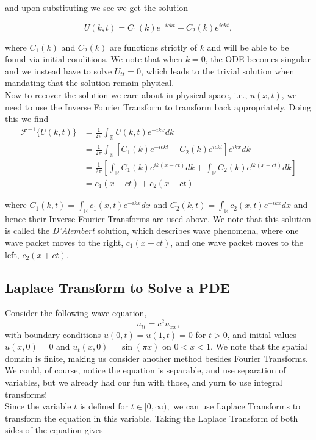 and upon substituting we see we get the solution

$$U(k,t) = C_1(k)e^{-ickt} + C_2(k) e^{ickt},$$

where $C_1(k)$ and $C_2(k)$ are functions strictly of $k$ and will be able to be found via initial conditions. We note that when $k=0$, the ODE becomes singular and we instead have to solve $U_{tt} = 0$, which leads to the trivial solution when mandating that the solution remain physical. \\

Now to recover the solution we care about in physical space, i.e., $u(x,t)$, we need to use the Inverse Fourier Transform to transform back appropriately. Doing this we find
\begin{align*}
\mathscr{F}^{-1}\{ U(k,t)  \} &= \frac{1}{2\pi} \int_{\mathbb{R}} U(k,t) e^{-ikx} dk\\
&= \frac{1}{2\pi} \int_{\mathbb{R}} \left[ C_1(k) e^{-ickt} + C_2(k) e^{ickt} \right] e^{ikx} dk\\
&= \frac{1}{2\pi} \left[ \int_{\mathbb{R}} C_1(k) e^{ik(x-ct)} dk + \int_{\mathbb{R}} C_2(k) e^{ik(x+ct)} dk  \right] \\
&= c_1(x-ct) + c_2(x+ct) 
\end{align*}

where $C_1(k,t) = \int_{\mathbb{R}} c_1(x,t) e^{-ikx} dx$ and $C_2(k,t) = \int_{\mathbb{R}} c_2(x,t) e^{-ikx} dx$ and hence their Inverse Fourier Transforms are used above. We note that this solution is called the \emph{D'Alembert} solution, which describes wave phenomena, where one wave packet moves to the right, $c_1(x-ct)$, and one wave packet moves to the left, $c_2(x+ct).$


%
%
\subsection{Laplace Transform to Solve a PDE}

Consider the following wave equation, $$u_{tt}=c^2 u_{xx},$$
with boundary conditions $u(0,t)=u(1,t) = 0$ for $t>0$, and initial values $u(x,0)=0$ and $u_t(x,0) = \sin(\pi x)$ on $0<x<1$. We note that the spatial domain is finite, making us consider another method besides Fourier Transforms. We could, of course, notice the equation is separable, and use separation of variables, but we already had our fun with those, and yurn to use integral transforms! \\

Since the variable $t$ is defined for $t\in[0,\infty),$ we can use Laplace Transforms to transform the equation in this variable. Taking the Laplace Transform of both sides of the equation gives

